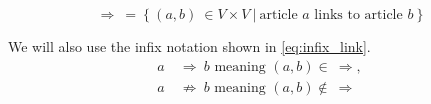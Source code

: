 \begin{equation}
\label{eq:binary_relation}
\Rightarrow\ =\ \{\ (a,b)\ \in V \times V\ |\ \text{article } a \text{ links to article } b\ \}
\end{equation}

We will also use the infix notation shown in \cref{eq:infix_link}.
\begin{equation}
\label{eq:infix_link}
  \begin{split}
    a\ & \Rightarrow\ b \text{ meaning } (a,b) \in\ \Rightarrow,\\
    a\ & \not\Rightarrow\ b \text{ meaning } (a,b) \not\in\ \Rightarrow
  \end{split}
\end{equation}

